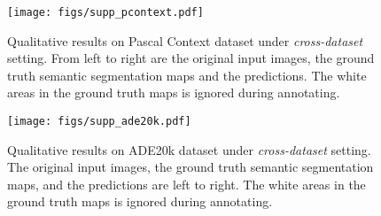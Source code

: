\documentclass[runningheads]{llncs}
\begin{document}
\begin{figure}[t]
  \centering
     \texttt{[image: figs/supp\_pcontext.pdf]}
     \caption{Qualitative results on Pascal Context dataset under \emph{cross-dataset} setting. From left to right are the original input images, the ground truth semantic segmentation maps and the predictions. The white areas in the ground truth maps is ignored during annotating. }
     \label{fig:supp_pascal}
     \vspace{-2em}
\end{figure}
\begin{figure}[t]
    \centering
    \texttt{[image: figs/supp\_ade20k.pdf]} 
     \caption{Qualitative results on ADE20k dataset under \emph{cross-dataset} setting. The original input images, the ground truth semantic segmentation maps, and the predictions are left to right. The white areas in the ground truth maps is ignored during annotating. }
     \label{fig:supp_ade}
\end{figure}


\clearpage


\end{document}
